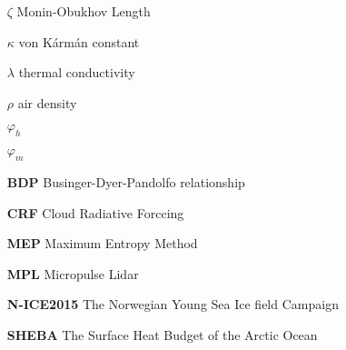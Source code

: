 \bigskip %
\begin{enumerate}
    \item[$\zeta$] Monin-Obukhov Length
    \item[$\kappa$] von Kármán constant
    \item[$\lambda$] thermal conductivity
    \item[$\rho$] air density
    \item[$\varphi_{h}$]
    \item[$\varphi_{m}$]
\end{enumerate}
\bigskip %
\begin{enumerate}
    \item[\textbf{BDP}] Businger-Dyer-Pandolfo relationship
    \item[\textbf{CRF}] Cloud Radiative Forccing
    \item[\textbf{MEP}] Maximum Entropy Method
    \item[\textbf{MPL}] Micropulse Lidar
    \item[\textbf{N-ICE2015}] The Norwegian Young Sea Ice field Campaign  
    \item[\textbf{SHEBA}] The Surface Heat Budget of the Arctic Ocean
\end{enumerate}
